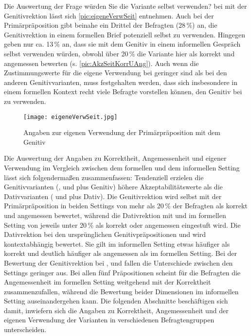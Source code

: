 Die Auswertung der Frage \glqq würden Sie die Variante selbst verwenden?\grqq{} bei  mit der Genitivrektion lässt sich \autoref{pic:eigeneVerwSeit} entnehmen. 
Auch bei der Primärpräposition  gibt beinahe ein Drittel der Befragten (28\,\%) an, die Genitivrektion in einem formellen Brief potenziell selbst zu verwenden. 
Hingegen geben nur ca. 13\,\% an, dass sie  mit dem Genitiv in einem informellen Gespräch selbst verwenden würden, obwohl über 20\,\% die Variante hier als korrekt und angemessen bewerten (s. \autoref{pic:AkzSeitKorrUAng}). 
Auch wenn die Zustimmungswerte für die eigene Verwendung bei  geringer sind als bei den anderen Genitivvarianten, muss festgehalten werden, dass sich insbesondere in einem formellen Kontext recht viele Befragte vorstellen können, den Genitiv bei  zu verwenden.\largerpage

\begin{figure}
\centering
\texttt{[image: eigeneVerwSeit.jpg]}
\caption{Angaben zur eigenen Verwendung der Primärpräposition  mit dem Genitiv}
\label{pic:eigeneVerwSeit}
\end{figure}

Die Auswertung der Angaben zu Korrektheit, Angemessenheit und eigener Verwendung im Vergleich zwischen dem formellen und dem informellen Setting lässt sich folgendermaßen zusammenfassen:
Tendenziell erzielen die Genitivvarianten (\dank{}, \gegenueber{} und  plus Genitiv) höhere Akzeptabilitätswerte als die Dativvarianten (\wegen{} und \waehrend{} plus Dativ). 
Die Genitivrektion wird selbst mit der Primärpräposition  in beiden Settings von mehr als 20\,\% der Befragten als korrekt und angemessen bewertet, während die Dativrektion mit \wegen{} und \waehrend{} im formellen Setting von jeweils unter 20\,\% als korrekt oder angemessen eingestuft wird. 
Die Dativrektion bei den ursprünglichen Genitivpräpositionen \wegen{} und \waehrend{} wird kontextabhängig bewertet.
Sie gilt im informellen Setting etwas häufiger als korrekt und deutlich häufiger als angemessen als im formellen Setting. 
Bei der Bewertung der Genitivrektion bei \dank{}, \gegenueber{} und  fallen die Unterschiede zwischen den Settings geringer aus.  
Bei allen fünf Präpositionen scheint für die Befragten die Angemessenheit im formellen Setting weitgehend mit der Korrektheit zusammenzufallen, während die Bewertung beider Dimensionen im informellen Setting auseinandergehen kann. 
Die folgenden Abschnitte beschäftigen sich damit, inwiefern sich die Angaben zu Korrektheit, Angemessenheit und der eigenen Verwendung der Varianten in verschiedenen Befragtengruppen unterscheiden. 

